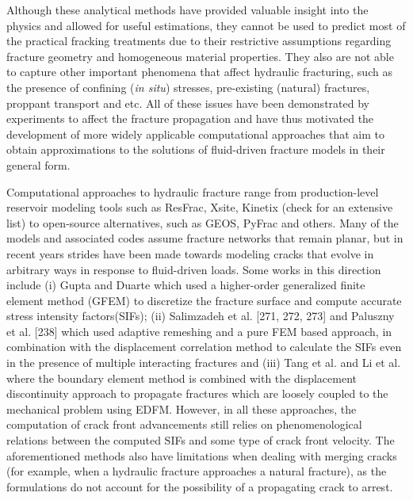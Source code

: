    Although these analytical methods have provided valuable insight into the physics and allowed for useful estimations, they cannot be used to predict most of the practical fracking treatments due to their restrictive assumptions regarding fracture geometry and homogeneous material properties. They also are not able to capture other important phenomena that affect hydraulic fracturing, such as the presence of confining (\textit{in situ}) stresses, pre-existing (natural) fractures, proppant transport and etc.
    All of these issues have been demonstrated by experiments to affect the fracture propagation and have thus motivated the development of more widely applicable computational approaches that aim to obtain approximations to the solutions of fluid-driven fracture models in their general form.

Computational approaches to hydraulic fracture range from production-level reservoir modeling tools such as ResFrac\cite{mcclure2017three, mcclure2018resfrac}, Xsite\cite{itasca}, Kinetix\cite{kinetix,kinetixforpetrel} (check \cite{chen2021review} for an extensive list) to open-source alternatives, such as GEOS\cite{settgast2012simulation, settgast2014simulation, settgast2017fully}, PyFrac\cite{zia2020pyfrac} and others. Many of the models and associated codes assume fracture networks that remain planar, but in recent years strides have been made towards modeling cracks that evolve in arbitrary ways in response to fluid-driven loads. Some works in this direction include (i) Gupta and Duarte \cite{gupta2014simulation, gupta2018coupled} which used a higher-order generalized finite element method (GFEM) to discretize the fracture surface and compute accurate stress intensity factors(SIFs); (ii) Salimzadeh et al. [271, 272, 273] and Paluszny et al. [238] which used adaptive remeshing and a pure FEM based approach, in combination with the displacement correlation method to calculate the SIFs even in the presence of multiple interacting fractures and (iii) Tang et al. \cite{tang2019analysis} and Li et al. \cite{li2020hydromechanical,li2021development} where the boundary element method is combined with the displacement discontinuity approach to propagate fractures which are loosely coupled to the mechanical problem using EDFM\cite{hajibeygi2011hierarchical}. However, in all these approaches, the computation of crack front advancements still relies on phenomenological relations between the computed SIFs and some type of crack front velocity. The aforementioned methods also have limitations when dealing with merging cracks (for example, when a hydraulic fracture approaches a natural fracture), as the formulations do not account for the possibility of a propagating crack to arrest.
    

